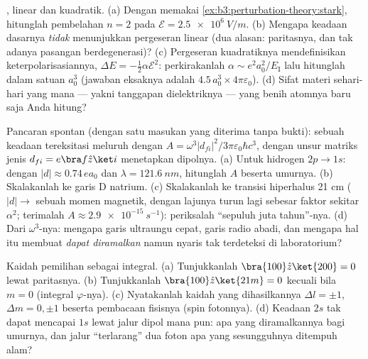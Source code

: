 \begin{exercise}[$\star\star$]\label{exo:b3:perturbation-theory:7}
, linear dan kuadratik. (a) Dengan memakai
\cref{ex:b3:perturbation-theory:stark}, hitunglah pembelahan $n = 2$
pada $\mathcal E = \qty{2.5e6}{V/m}$. (b) Mengapa keadaan dasarnya
\emph{tidak} menunjukkan pergeseran linear (dua alasan: paritasnya, dan
tak adanya pasangan berdegenerasi)? (c) Pergeseran kuadratiknya
mendefinisikan keterpolarisasiannya, $\Delta E = -\tfrac12\alpha\mathcal E^2$:
perkirakanlah $\alpha \sim e^2a_0^2/E_{\text{I}}$ lalu hitunglah dalam
satuan $a_0^3$ (jawaban eksaknya adalah $4.5\,a_0^3 \times
4\pi\varepsilon_0$). (d) Sifat materi sehari-hari yang mana --- yakni
tanggapan dielektriknya --- yang benih atomnya baru saja Anda hitung?
\end{exercise}

\begin{exercise}[$\star\star$]\label{exo:b3:perturbation-theory:8}
Pancaran spontan (dengan satu masukan yang diterima tanpa bukti): sebuah
keadaan tereksitasi meluruh dengan $A = \omega^3|d_{fi}|^2/3\pi\varepsilon_0\hbar c^3$,
dengan unsur matriks jenis $d_{fi} = e\bra f\hat z\ket i$ menetapkan
dipolnya. (a) Untuk hidrogen $2p \to 1s$: dengan $|d| \approx 0.74\,
ea_0$ dan $\lambda = \qty{121.6}{nm}$, hitunglah $A$ beserta umurnya.
(b) Skalakanlah ke garis D natrium. (c) Skalakanlah ke transisi
hiperhalus 21 cm ($|d| \to$ sebuah momen magnetik, dengan lajunya turun
lagi sebesar faktor sekitar $\alpha^2$; terimalah $A \approx
\qty{2.9e-15}{s^{-1}}$): periksalah ``sepuluh juta tahun''-nya. (d)
Dari $\omega^3$-nya: mengapa garis ultraungu cepat, garis radio abadi,
dan mengapa hal itu membuat  \emph{dapat diramalkan} namun
nyaris tak terdeteksi di laboratorium?
\end{exercise}

\begin{exercise}[$\star\star$]\label{exo:b3:perturbation-theory:9}
Kaidah pemilihan sebagai integral. (a) Tunjukkanlah $\bra{100}\hat z\ket{200} =
0$ lewat paritasnya. (b) Tunjukkanlah $\bra{100}\hat z\ket{21m} = 0$
kecuali bila $m =
0$ (integral $\varphi$-nya). (c) Nyatakanlah kaidah
yang dihasilkannya $\Delta
l = \pm1$, $\Delta m = 0, \pm1$ beserta pembacaan fisisnya (spin
fotonnya). (d) Keadaan $2s$ tak dapat mencapai $1s$ lewat jalur dipol
mana pun: apa yang diramalkannya bagi umurnya, dan jalur ``terlarang''
dua foton apa yang sesungguhnya ditempuh alam?
\end{exercise}


